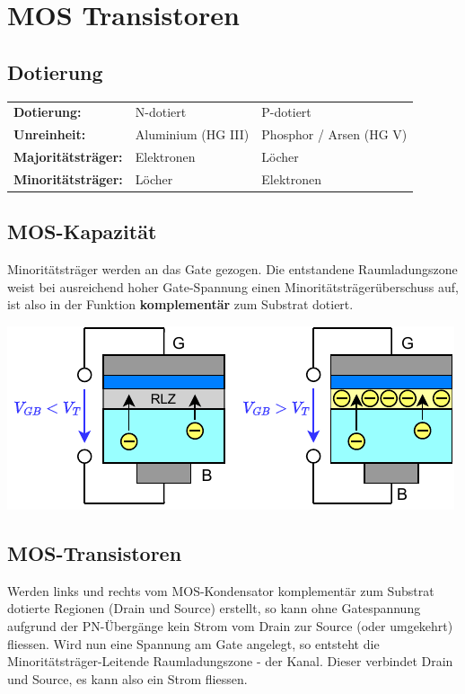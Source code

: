 \section{MOS Transistoren}

\subsection{Dotierung}
\begin{center}
    \begin{tabular}{lll}
        \textbf{Dotierung:}          & N-dotiert            & P-dotiert \\
        \textbf{Unreinheit:}         & Aluminium (HG III)   & Phosphor / Arsen (HG V) \\
        \textbf{Majoritätsträger:}   & Elektronen           & Löcher \\
        \textbf{Minoritätsträger:}   & Löcher               & Elektronen \\
    \end{tabular}
\end{center}


\subsection{MOS-Kapazität}
\begin{minipage}[t]{0.5\columnwidth}
    Minoritätsträger werden an das Gate gezogen.
    Die entstandene Raumladungszone weist bei ausreichend hoher Gate-Spannung einen Minoritätsträgerüberschuss auf, ist also in der Funktion \textbf{komplementär} zum Substrat dotiert.
\end{minipage}
\hfill
\begin{minipage}[t]{0.48\columnwidth}
    \includegraphics[width=\columnwidth, align=t]{images/02_MOS_kapazitaet.pdf}
\end{minipage}


\subsection{MOS-Transistoren}
Werden links und rechts vom MOS-Kondensator komplementär zum Substrat dotierte Regionen (Drain und Source) erstellt, so kann ohne Gatespannung aufgrund der PN-Übergänge kein Strom vom Drain zur Source (oder umgekehrt) fliessen.
Wird nun eine Spannung am Gate angelegt, so entsteht die Minoritätsträger-Leitende Raumladungszone - der Kanal.
Dieser verbindet Drain und Source, es kann also ein Strom fliessen.

